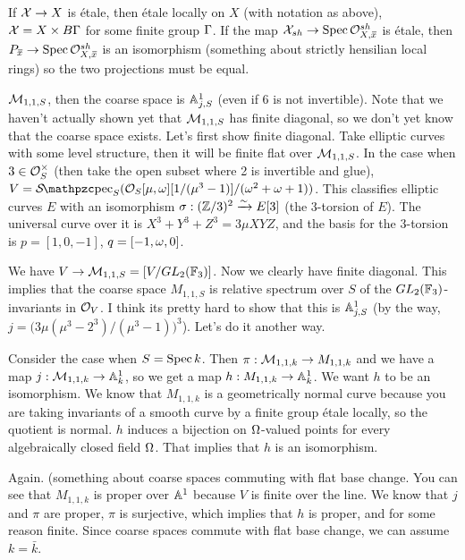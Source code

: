 \begin{remark}
  If $\X\to X$ is \'etale, then \'etale locally on $X$ (with notation
as above), $\X=X\times B\Ga$ for some finite group $\Ga$. If the map
$\X_{sh}\to \spec \O_{X,\bbar x}^{sh}$ is \'etale, then $P_{\bbar
x}\to \spec \O_{X,\bbar x}^{sh}$ is an isomorphism (something about
strictly hensilian local rings) so the two projections must be equal.
\end{remark}
\begin{example}
  $\M_{1,1,S}$, then the coarse space is $\AA^1_{j,S}$ (even if 6 is
not invertible). Note that we haven't actually shown yet that
$\M_{1,1,S}$ has finite diagonal, so we don't yet know that the
coarse space exists. Let's first show finite diagonal. Take elliptic
curves with some level structure, then it will be finite flat over
$\M_{1,1,S}$. In the case when $3\in \O_S^\times$ (then take the open
subset where 2 is invertible and glue), $V=\Spec_S
(\O_S[\mu,\w][1/(\mu^3-1)]/(\w^2+\w+1))$. This classifies elliptic
curves $E$ with an isomorphism $\sigma: (\ZZ/3)^2\xrightarrow\sim
E[3]$ (the 3-torsion of $E$). The universal curve over it is
$X^3+Y^3+Z^3=3\mu XYZ$, and the basis for the 3-torsion is
$p=[1,0,-1]$, $q=[-1,\w,0]$.

  We have $V\to \M_{1,1,S}=[V/GL_2(\FF_3)]$. Now we clearly have
finite diagonal. This implies that the coarse space $M_{1,1,S}$ is
relative spectrum over $S$ of the $GL_2(\FF_3)$-invariants in $\O_V$.
I think its pretty hard to show that this is $\AA^1_{j,S}$ (by the
way, $j=\bigl(3\mu(\mu^3-2^3)/(\mu^3-1)\bigr)^3$). Let's do it
another way.

  Consider the case when $S=\spec k$. Then $\pi:\M_{1,1,k}\to
M_{1,1,k}$ and we have a map $j:\M_{1,1,k}\to \AA^1_k$, so we get a
map $h:M_{1,1,k}\to \AA^1_k$. We want $h$ to be an isomorphism. We
know that $M_{1,1,k}$ is a geometrically normal curve because you are
taking invariants of a smooth curve by a finite group \'etale
locally, so the quotient is normal. $h$ induces a bijection on
$\Om$-valued points for every algebraically closed field $\Om$. That
implies that $h$ is an isomorphism.

  Again. (something about coarse spaces commuting with flat base
change. You can see that $M_{1,1,k}$ is proper over $\AA^1$ because
$V$ is finite over the line. We know that $j$ and $\pi$ are proper,
$\pi$ is surjective, which implies that $h$ is proper, and for some
reason finite. Since coarse spaces commute with flat base change, we
can assume $k=\bar k$.


\end{example}
